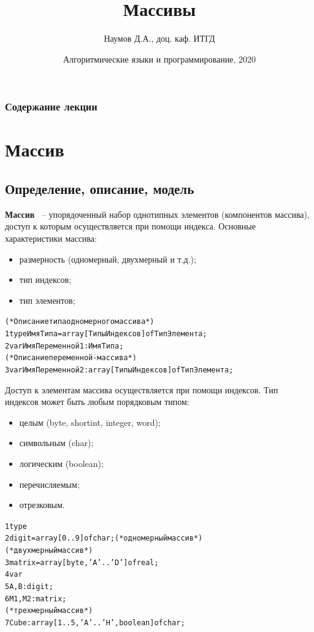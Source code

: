 \documentclass{beamer}
\title[Массивы]{Массивы}
\author{Наумов Д.А., доц. каф. ИТГД}
\date[14.02.2020] {Алгоритмические языки и программирование, 2020}
\begin{document}
\begin{frame}
  \titlepage
\end{frame}
  
\begin{frame}
  \frametitle{Содержание лекции}
  \tableofcontents  
\end{frame}
  
\section{Массив}
\subsection{Определение, описание, модель}
\begin{frame}[fragile]
\textbf{Массив} ~-- упорядоченный набор однотипных элементов (компонентов массива), доступ к которым осуществляется при помощи индекса.
Основные характеристики массива:
\begin{itemize}
\item размерность (одномерный, двухмерный и т.д.);
\item тип индексов;
\item тип элементов;
\end{itemize}
\begin{alltt}
(* Описание типа одномерного массива *)
1  type ИмяТипа = array[ТипыИндексов] of ТипЭлемента;
2  var ИмяПеременной1: ИмяТипа;
(* Описание переменной-массива *)
3  var ИмяПеременной2: array[ТипыИндексов] of ТипЭлемента;
\end{alltt}
\end{frame}

\begin{frame}[fragile]
Доступ к элементам массива осуществляется при помощи индексов. Тип индексов может быть любым порядковым типом:
\begin{itemize}
\item целым (byte, shortint, integer, word);
\item символьным (char);
\item логическим (boolean);
\item перечисляемым;
\item отрезковым.
\end{itemize}
\begin{alltt}
1 type
2    digit = array[0..9] of char; (*одномерный массив*)
(* двухмерный массив *)
3    matrix = array[byte, 'A'..'D'] of real;  
4 var
5    A, B : digit;
6    M1, M2 : matrix; 
(* трехмерный массив *)
7    Cube : array[1..5, 'A'..'H', boolean] of char; 
\end{alltt}
\end{frame}
\end{document}
